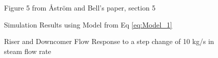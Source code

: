         \begin{figure}[ht]
            \begin{center}
                
                Figure 5 from \r{A}str\"{o}m and Bell's paper, section 5 \cite{Astrom}
                
                
                Simulation Results using Model from Eq \eqref{eq:Model_1}
                
                \caption{Riser and Downcomer Flow Response to a step change of 10 kg/s in steam flow rate}
                \label{fig:Fig5C}
            \end{center}
        \end{figure}
